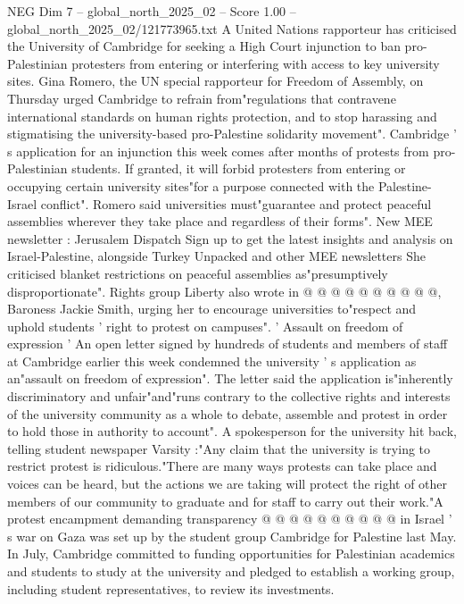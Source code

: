 \begin{textsample}{NEG Dim 7 – global\_north\_2025\_02 – Score 1.00 – global\_north\_2025\_02/121773965.txt}  \label{ex:f7_neg_175}
A United Nations rapporteur has criticised the University of Cambridge for seeking a High Court injunction to ban pro-Palestinian protesters from entering or interfering with access to key university sites.
Gina Romero, the UN special rapporteur for Freedom of Assembly, on Thursday urged Cambridge to refrain from"regulations that contravene international standards on human rights protection, and to stop harassing and stigmatising the university-based pro-Palestine solidarity movement".
Cambridge ' s application for an injunction this week comes after months of protests from pro-Palestinian students.
If granted, it will forbid protesters from entering or occupying certain university sites"for a purpose connected with the Palestine-Israel conflict".
Romero said universities must"guarantee and protect peaceful assemblies wherever they take place and regardless of their forms".
New MEE newsletter : Jerusalem Dispatch Sign up to get the latest insights and analysis on Israel-Palestine, alongside Turkey Unpacked and other MEE newsletters She criticised blanket restrictions on peaceful assemblies as"presumptively disproportionate".
Rights group Liberty also wrote in @ @ @ @ @ @ @ @ @ @, Baroness Jackie Smith, urging her to encourage universities to"respect and uphold students ' right to protest on campuses". ' Assault on freedom of expression ' An open letter signed by hundreds of students and members of staff at Cambridge earlier this week condemned the university ' s application as an"assault on freedom of expression".
The letter said the application is"inherently discriminatory and unfair"and"runs contrary to the collective rights and interests of the university community as a whole to debate, assemble and protest in order to hold those in authority to account".
A spokesperson for the university hit back, telling student newspaper Varsity :"Any claim that the university is trying to restrict protest is ridiculous."There are many ways protests can take place and voices can be heard, but the actions we are taking will protect the right of other members of our community to graduate and for staff to carry out their work."A protest encampment demanding transparency @ @ @ @ @ @ @ @ @ @ in Israel ' s war on Gaza was set up by the student group Cambridge for Palestine last May.
In July, Cambridge committed to funding opportunities for Palestinian academics and students to study at the university and pledged to establish a working group, including student representatives, to review its investments.

\end{textsample}
